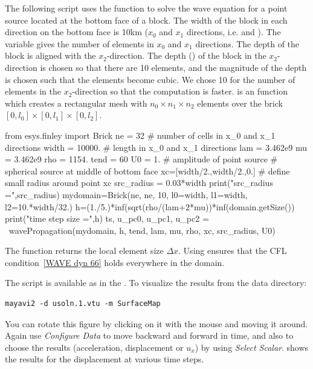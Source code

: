 The following script uses the  function to solve the
wave equation for a point source located at the bottom face of a block.
The width of the block in each direction on the bottom face is 10km
($x_0$ and $x_1$ directions, i.e.  and ).
The variable  gives the number of elements in $x_{0}$ and $x_1$ directions.
The depth of the block is aligned with the $x_{2}$-direction.
The depth () of the block in the $x_{2}$-direction is chosen
so that there are 10 elements, and the magnitude of the depth is chosen such
that the elements become cubic.
We chose 10 for the number of elements in the $x_{2}$-direction so
that the computation is faster. 
is an \finley function which creates a rectangular mesh with $n_0 \times n_1 \times n_2$
elements over the brick $[0,l_0] \times [0,l_1] \times [0,l_2]$.
\begin{python}
  from esys.finley import Brick
  ne = 32          # number of cells in x_0 and x_1 directions
  width = 10000.   # length in x_0 and x_1 directions
  lam = 3.462e9
  mu = 3.462e9
  rho = 1154.
  tend = 60
  U0 = 1. # amplitude of point source
  # spherical source at middle of bottom face
  xc=[width/2.,width/2.,0.]
  # define small radius around point xc
  src_radius = 0.03*width
  print("src_radius =",src_radius)
  mydomain=Brick(ne, ne, 10, l0=width, l1=width, l2=10.*width/32.)
  h=(1./5.)*inf(sqrt(rho/(lam+2*mu))*inf(domain.getSize())
  print("time step size =",h)
  ts, u_pc0, u_pc1, u_pc2 =  \
          wavePropagation(mydomain, h, tend, lam, mu, rho, xc, src_radius, U0)
\end{python}
The  function returns the local element size $\Delta x$.
Using \function{inf} ensures that the CFL condition~\ref{WAVE dyn 66}  holds
everywhere in the domain. 

The script is available as  in the \ExampleDirectory{}. 
To visualize the results from the data directory:
\begin{verbatim} 
mayavi2 -d usoln.1.vtu -m SurfaceMap
\end{verbatim}
You can rotate this figure by clicking on it with the mouse and moving it around.
Again use \emph{Configure Data} to move backward and forward in time, and
also to choose the results (acceleration, displacement or $u_x$) by
using \emph{Select Scalar}.
 shows the results for the displacement at various time steps.

